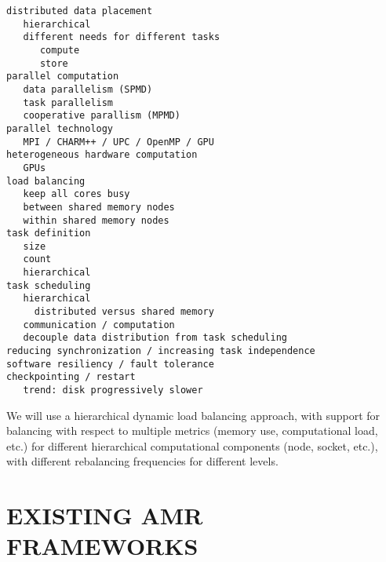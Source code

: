 \documentclass[14pt,letter]{article}
\begin{document}
\begin{verbatim}
distributed data placement
   hierarchical
   different needs for different tasks
      compute
      store
parallel computation
   data parallelism (SPMD)
   task parallelism
   cooperative parallism (MPMD)
parallel technology
   MPI / CHARM++ / UPC / OpenMP / GPU
heterogeneous hardware computation
   GPUs
load balancing
   keep all cores busy
   between shared memory nodes
   within shared memory nodes
task definition
   size
   count
   hierarchical
task scheduling
   hierarchical
     distributed versus shared memory
   communication / computation
   decouple data distribution from task scheduling
reducing synchronization / increasing task independence
software resiliency / fault tolerance
checkpointing / restart
   trend: disk progressively slower
\end{verbatim}



We will use a hierarchical dynamic load balancing approach, with
support for balancing with respect to multiple metrics (memory use,
computational load, etc.) for different hierarchical computational
components (node, socket, etc.), with different rebalancing
frequencies for different levels.

\section{EXISTING AMR FRAMEWORKS} \label{s:review}
\end{document}
